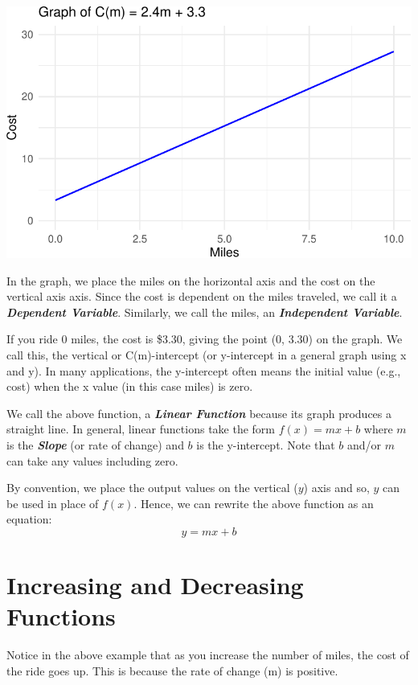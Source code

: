 \documentclass[
  letterpaper,
  DIV=11,
  numbers=noendperiod]{scrreprt}
\begin{document}
\includegraphics{Intro_LF_files/figure-pdf/unnamed-chunk-1-1.pdf}

In the graph, we place the miles on the horizontal axis and the cost on
the vertical axis axis. Since the cost is dependent on the miles
traveled, we call it a \textbf{\emph{Dependent Variable}}. Similarly, we
call the miles, an \textbf{\emph{Independent Variable}}.

If you ride 0 miles, the cost is \$3.30, giving the point (0, 3.30) on
the graph. We call this, the vertical or C(m)-intercept (or y-intercept
in a general graph using x and y). In many applications, the y-intercept
often means the initial value (e.g., cost) when the x value (in this
case miles) is zero.

We call the above function, a \textbf{\emph{Linear Function}} because
its graph produces a straight line. In general, linear functions take
the form \(f(x)=mx+b\) where \(m\) is the \textbf{\emph{Slope}} (or rate
of change) and \(b\) is the y-intercept. Note that \(b\) and/or \(m\)
can take any values including zero.

By convention, we place the output values on the vertical (\(y\)) axis
and so, \(y\) can be used in place of \(f(x)\). Hence, we can rewrite
the above function as an equation: \[y=mx+b\]

\hypertarget{increasing-and-decreasing-functions}{%
\section{Increasing and Decreasing
Functions}\label{increasing-and-decreasing-functions}}

Notice in the above example that as you increase the number of miles,
the cost of the ride goes up. This is because the rate of change (m) is
positive.
\end{document}
